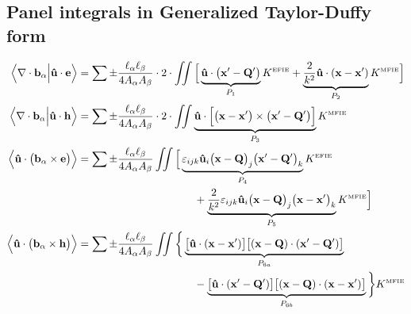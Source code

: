 \subsection*{Panel integrals in Generalized Taylor-Duffy form}

\begin{align*}
 \Big\langle \nabla \cdot \mathbf{b}_\alpha \Big|  \mathbf{\hat u} \cdot \mathbf{e}  \Big\rangle
&= \sum \pm \frac{\ell_\alpha \ell_\beta}{4A_\alpha A_\beta}
   \cdot
   2\cdot\iint 
   \Big[ \underbrace{ \mathbf{\hat u}\cdot\big(\mathbf{x}^\prime-\mathbf{Q}^\prime\big)
                    }_{P_1} K^{\hbox{\tiny{EFIE}}}
        +\underbrace{ \frac{2}{k^2}\mathbf{\hat u}\cdot(\mathbf{x}-\mathbf{x}^\prime)
                    }_{P_2} K^{\hbox{\tiny{MFIE}}}
   \Big]
\\
 \Big\langle \nabla \cdot \mathbf{b}_\alpha \Big| \mathbf{\hat u} \cdot \mathbf{h} \Big\rangle
&= \sum \pm \frac{\ell_\alpha \ell_\beta}{4A_\alpha A_\beta}
   \cdot
   2\cdot
   \iint \underbrace{ \mathbf{\hat u}\cdot
                      \Big[ \big(\mathbf{x}-\mathbf{x}^\prime \big) \times
                            \big(\mathbf{x}^\prime-\mathbf{Q}^\prime \big)
                      \Big]
                    }_{P_3} K^{\hbox{\tiny{MFIE}}}
\\
 \Big\langle \mathbf{\hat u} \cdot \big(\mathbf{b}_\alpha \times \mathbf{e}\big) \Big\rangle
&= \sum \pm \frac{\ell_\alpha \ell_\beta}{4A_\alpha A_\beta}
   \iint
   \Big[ \underbrace{ \varepsilon_{ijk} 
                      \mathbf{\hat u}_i
                      \big(\mathbf{x}-\mathbf{Q}\big)_j
                      \big(\mathbf{x}^\prime-\mathbf{Q}^\prime\big)_k
                    }_{P_4} K^{\hbox{\tiny{EFIE}}}
\\
&\hspace{1.5in}
        +\underbrace{ \frac{2}{k^2} \varepsilon_{ijk}
                      \mathbf{\hat u}_i
                      \big(\mathbf{x}-\mathbf{Q}\big)_j
                      \big(\mathbf{x}-\mathbf{x}^\prime\big)_k
                    }_{P_5} K^{\hbox{\tiny{MFIE}}}
   \Big]
\\
 \Big\langle \mathbf{\hat u} \cdot \big(\mathbf{b}_\alpha \times \mathbf{h}\big) \Big\rangle
&= \sum \pm \frac{\ell_\alpha \ell_\beta}{4A_\alpha A_\beta}
   \iint
   \bigg\{ \underbrace{ \big[\mathbf{\hat u}\cdot(\mathbf{x}-\mathbf{x}^\prime)\big]
                        \big[(\mathbf{x}-\mathbf{Q})\cdot(\mathbf{x}^\prime-\mathbf{Q}^\prime)
                        \big]
                      }_{P_{6a}}
\\
&\hspace{1.5in}
          -\underbrace{ \big[\mathbf{\hat u}\cdot(\mathbf{x}^\prime-\mathbf{Q}^\prime)\big]
                        \big[(\mathbf{x}-\mathbf{Q})\cdot(\mathbf{x}-\mathbf{x}^\prime)
                        \big]
                      }_{P_{6b}}
   \bigg\} K^{\hbox{\tiny{MFIE}}}
\end{align*}

